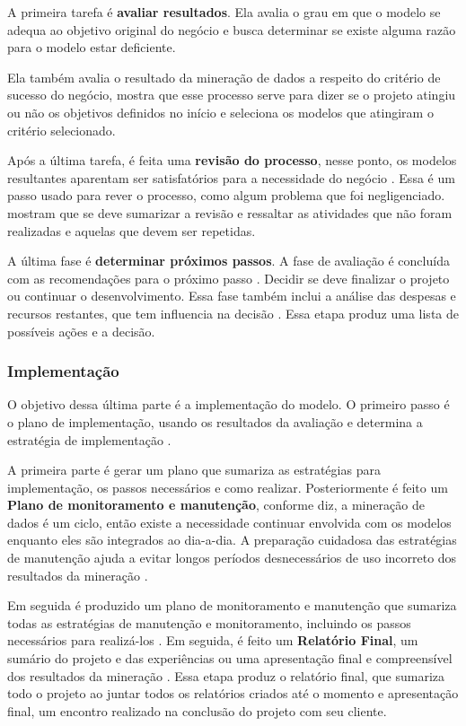 A primeira tarefa é \textbf{avaliar resultados}. Ela avalia o grau em que o modelo se adequa ao objetivo original do negócio e busca determinar se existe alguma razão para o modelo estar deficiente.

Ela também avalia o resultado da mineração de dados a respeito do critério de sucesso do negócio,  mostra que esse processo serve para dizer se o projeto atingiu ou não os objetivos definidos no início e seleciona os modelos que atingiram o critério selecionado.

Após a última tarefa, é feita uma \textbf{revisão do processo}, nesse ponto, os modelos resultantes aparentam ser satisfatórios para a necessidade do negócio \citep{crispmanual}. Essa é um passo usado para rever o processo, como algum problema que foi negligenciado.  mostram que se deve sumarizar a revisão e ressaltar as atividades que não foram realizadas e aquelas que devem ser repetidas.

A última fase é \textbf{determinar próximos passos}. A fase de avaliação é concluída com as recomendações para o próximo passo \citep{dmfd}. Decidir se deve finalizar o projeto ou continuar o desenvolvimento. Essa fase também inclui a análise das despesas e recursos restantes, que tem influencia na decisão \citep{crispmanual}.
Essa etapa produz uma lista de possíveis ações e a decisão.

\subsubsection{Implementação}
O objetivo dessa última parte é a implementação do modelo.
O primeiro passo é o plano de implementação, usando os resultados da avaliação e determina a estratégia de implementação \citep{crispmanual}. 

A primeira parte é gerar um plano que sumariza as estratégias para implementação, os passos necessários e como realizar.
Posteriormente é feito um \textbf{Plano de monitoramento e manutenção}, conforme  diz, a mineração de dados é um ciclo, então existe a necessidade continuar envolvida com os modelos enquanto eles são integrados ao dia-a-dia. A preparação cuidadosa das estratégias de manutenção ajuda a evitar longos períodos desnecessários de uso incorreto dos resultados da mineração \citep{crispmanual}.

Em seguida é produzido um plano de monitoramento e manutenção que sumariza todas as estratégias de manutenção e monitoramento, incluindo os passos necessários para realizá-los \citep{crispmanual}.
Em seguida, é feito um \textbf{Relatório Final}, um sumário do projeto e das experiências ou uma apresentação final e compreensível dos resultados da mineração \citep{crispmanual}.
Essa etapa produz o relatório final, que sumariza todo o projeto ao juntar todos os relatórios criados até o momento \citep{dmfd} e apresentação final, um encontro realizado na conclusão do projeto com seu cliente.

